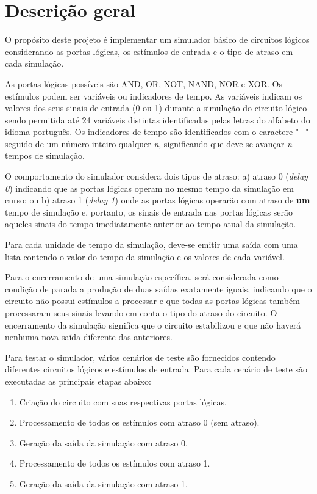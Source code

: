 
\section{Descrição geral}


O propósito deste projeto é implementar um simulador básico de circuitos lógicos considerando as portas lógicas, 
os estímulos de entrada e o tipo de atraso em cada simulação.

As portas lógicas possíveis são AND, OR, NOT, NAND, NOR e XOR. 
Os estímulos podem ser variáveis ou indicadores de tempo.
As variáveis indicam os valores dos seus sinais de entrada (0 ou 1)  
durante a simulação do circuito lógico sendo permitida até 24 variáveis distintas identificadas 
pelas letras do alfabeto do idioma português. Os indicadores de tempo são identificados com o caractere "+" \space
seguido de um número inteiro qualquer \textit{n}, significando que deve-se avançar \textit{n}
tempos de simulação.

O comportamento do simulador considera dois tipos de atraso: a) atraso 0 (\textit{delay 0}) 
indicando que as portas lógicas operam no mesmo tempo da simulação em curso; ou b) atraso 1 (\textit{delay 1}) onde as portas 
lógicas operarão com atraso de \textbf{um} tempo de simulação e, portanto, os sinais de entrada nas portas lógicas 
serão aqueles sinais do tempo 
imediatamente anterior ao tempo atual da simulação.

Para cada unidade de tempo da simulação, deve-se emitir uma saída com uma lista contendo o valor do tempo da simulação
e os valores de cada variável.

Para o encerramento de uma simulação específica, será considerada como condição de parada a produção de duas saídas exatamente 
iguais, indicando que o circuito não possui estímulos a processar e que todas as portas lógicas também processaram seus 
sinais levando em conta o tipo do atraso do circuito. O encerramento da simulação significa que o circuito 
estabilizou e que não haverá nenhuma nova saída diferente das anteriores.

Para testar o simulador, vários cenários de teste são fornecidos contendo diferentes circuitos lógicos e estímulos de entrada. 
Para cada cenário de teste são executadas as principais etapas abaixo:
\begin{enumerate}
    \item Criação do circuito com suas respectivas portas lógicas.
    \item Processamento de todos os estímulos com atraso 0 (sem atraso).
    \item Geração da saída da simulação com atraso 0.
    \item Processamento de todos os estímulos com atraso 1.
    \item Geração da saída da simulação com atraso 1.
\end{enumerate}